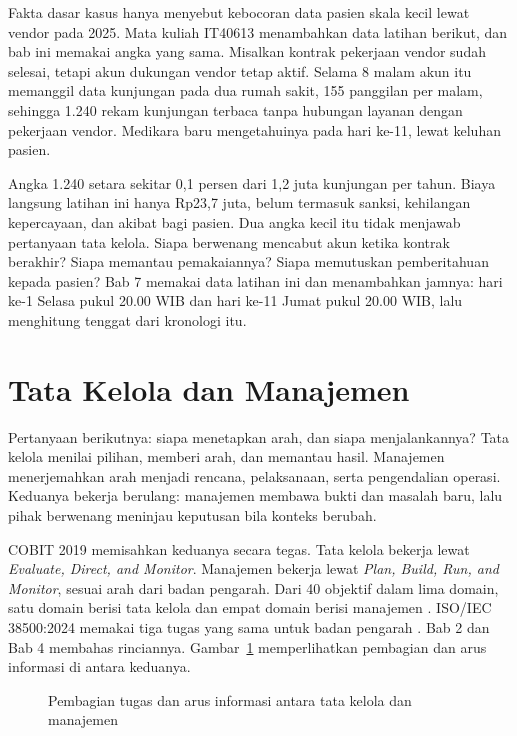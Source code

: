 \begin{kasus}[title={Kasus Medikara Health: Insiden Vendor 2025 dalam Data Latihan}]
Fakta dasar kasus hanya menyebut kebocoran data pasien skala kecil lewat vendor pada 2025.
Mata kuliah IT40613 menambahkan data latihan berikut, dan bab ini memakai angka yang sama.
Misalkan kontrak pekerjaan vendor sudah selesai, tetapi akun dukungan vendor tetap aktif.
Selama 8 malam akun itu memanggil data kunjungan pada dua rumah sakit, 155 panggilan per
malam, sehingga 1.240 rekam kunjungan terbaca tanpa hubungan layanan dengan pekerjaan
vendor. Medikara baru mengetahuinya pada hari ke-11, lewat keluhan pasien.

Angka 1.240 setara sekitar 0,1 persen dari 1,2 juta kunjungan per tahun. Biaya langsung
latihan ini hanya Rp23,7 juta, belum termasuk sanksi, kehilangan kepercayaan, dan akibat
bagi pasien. Dua angka kecil itu tidak menjawab pertanyaan tata kelola. Siapa berwenang
mencabut akun ketika kontrak berakhir? Siapa memantau pemakaiannya? Siapa memutuskan
pemberitahuan kepada pasien? Bab 7 memakai data latihan ini dan menambahkan jamnya: hari
ke-1 Selasa pukul 20.00 WIB dan hari ke-11 Jumat pukul 20.00 WIB, lalu menghitung tenggat dari
kronologi itu.
\end{kasus}

\section{Tata Kelola dan Manajemen}

Pertanyaan berikutnya: siapa menetapkan arah, dan siapa menjalankannya? Tata kelola menilai
pilihan, memberi arah, dan memantau hasil. Manajemen menerjemahkan
arah menjadi rencana, pelaksanaan, serta pengendalian operasi. Keduanya bekerja berulang:
manajemen membawa bukti dan masalah baru, lalu pihak berwenang meninjau keputusan bila
konteks berubah.

COBIT 2019 memisahkan keduanya secara tegas. Tata kelola bekerja lewat \textit{Evaluate,
Direct, and Monitor}. Manajemen bekerja lewat \textit{Plan, Build, Run, and Monitor}, sesuai
arah dari badan pengarah. Dari 40 objektif dalam lima domain, satu domain berisi tata
kelola dan empat domain berisi manajemen \cite{cobit2019-intro}. ISO/IEC 38500:2024 memakai
tiga tugas yang sama untuk badan pengarah \cite{iso38500-2024}. Bab 2 dan Bab 4 membahas
rinciannya. Gambar~\ref{fig:ch01-tata-kelola-manajemen} memperlihatkan pembagian dan arus
informasi di antara keduanya.

\begin{figure}[!htb]
  \centering
  
  \caption{Pembagian tugas dan arus informasi antara tata kelola dan manajemen}
  \label{fig:ch01-tata-kelola-manajemen}
\end{figure}

